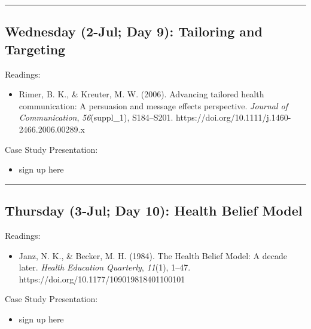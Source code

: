 \documentclass[
  letterpaper,
]{article}
\providecommand{\tightlist}{%
  \setlength{\itemsep}{0pt}\setlength{\parskip}{0pt}}\usepackage{longtable,booktabs,array}
\begin{document}
\begin{center}\rule{0.5\linewidth}{0.5pt}\end{center}

\hypertarget{wednesday-2-jul-day-9-tailoring-and-targeting}{%
\subsection{Wednesday (2-Jul; Day 9): Tailoring and
Targeting}\label{wednesday-2-jul-day-9-tailoring-and-targeting}}

Readings:

\begin{itemize}
\tightlist
\item
  Rimer, B. K., \& Kreuter, M. W. (2006). Advancing tailored health
  communication: A persuasion and message effects perspective.
  \emph{Journal of Communication}, \emph{56}(suppl\_1), S184--S201.
  https://doi.org/10.1111/j.1460-2466.2006.00289.x
\end{itemize}

Case Study Presentation:

\begin{itemize}
\tightlist
\item
  sign up here
\end{itemize}

\begin{center}\rule{0.5\linewidth}{0.5pt}\end{center}

\hypertarget{thursday-3-jul-day-10-health-belief-model}{%
\subsection{Thursday (3-Jul; Day 10): Health Belief
Model}\label{thursday-3-jul-day-10-health-belief-model}}

Readings:

\begin{itemize}
\tightlist
\item
  Janz, N. K., \& Becker, M. H. (1984). The Health Belief Model: A
  decade later. \emph{Health Education Quarterly}, \emph{11}(1), 1--47.
  https://doi.org/10.1177/109019818401100101
\end{itemize}

Case Study Presentation:

\begin{itemize}
\tightlist
\item
  sign up here
\end{itemize}
\end{document}
